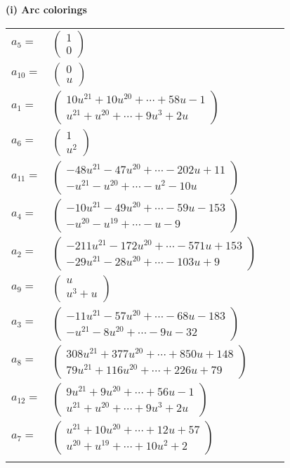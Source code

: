 \documentclass[1p]{elsarticle_modified}
\theoremstyle{definition}
\begin{document}
\flushleft \textbf{(i) Arc colorings}\\
\begin{tabular}{m{7pt} m{180pt} m{7pt} m{180pt} }
\flushright $a_{5}=$&$\begin{pmatrix}1\\0\end{pmatrix}$ \\
\flushright $a_{10}=$&$\begin{pmatrix}0\\u\end{pmatrix}$ \\
\flushright $a_{1}=$&$\begin{pmatrix}10 u^{21}+10 u^{20}+\cdots+58 u-1\\u^{21}+u^{20}+\cdots+9 u^3+2 u\end{pmatrix}$ \\
\flushright $a_{6}=$&$\begin{pmatrix}1\\u^2\end{pmatrix}$ \\
\flushright $a_{11}=$&$\begin{pmatrix}-48 u^{21}-47 u^{20}+\cdots-202 u+11\\- u^{21}- u^{20}+\cdots- u^2-10 u\end{pmatrix}$ \\
\flushright $a_{4}=$&$\begin{pmatrix}-10 u^{21}-49 u^{20}+\cdots-59 u-153\\- u^{20}- u^{19}+\cdots- u-9\end{pmatrix}$ \\
\flushright $a_{2}=$&$\begin{pmatrix}-211 u^{21}-172 u^{20}+\cdots-571 u+153\\-29 u^{21}-28 u^{20}+\cdots-103 u+9\end{pmatrix}$ \\
\flushright $a_{9}=$&$\begin{pmatrix}u\\u^3+u\end{pmatrix}$ \\
\flushright $a_{3}=$&$\begin{pmatrix}-11 u^{21}-57 u^{20}+\cdots-68 u-183\\- u^{21}-8 u^{20}+\cdots-9 u-32\end{pmatrix}$ \\
\flushright $a_{8}=$&$\begin{pmatrix}308 u^{21}+377 u^{20}+\cdots+850 u+148\\79 u^{21}+116 u^{20}+\cdots+226 u+79\end{pmatrix}$ \\
\flushright $a_{12}=$&$\begin{pmatrix}9 u^{21}+9 u^{20}+\cdots+56 u-1\\u^{21}+u^{20}+\cdots+9 u^3+2 u\end{pmatrix}$ \\
\flushright $a_{7}=$&$\begin{pmatrix}u^{21}+10 u^{20}+\cdots+12 u+57\\u^{20}+u^{19}+\cdots+10 u^2+2\end{pmatrix}$\\&\end{tabular}
\end{document}
